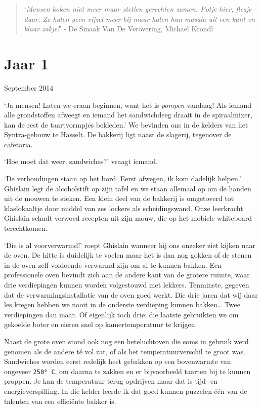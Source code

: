\documentclass[
  11pt,
  dutch,
]{memoir}
\begin{document}
\label{leerschool}

\begin{quote}
`\emph{Mensen koken niet meer maar stellen gerechten samen. Potje hier,
flesje daar. Ze halen geen vijzel meer bij maar halen hun masala uit een
kant-en-klaar zakje!}' - De Smaak Van De Verovering, Michael Krondl
\end{quote}

\hypertarget{jaar-1}{%
\section{Jaar 1}\label{jaar-1}}

\begin{flushright}
September 2014
\end{flushright}

`Ja mensen! Laten we eraan beginnen, want het is \emph{pompen} vandaag!
Als iemand alle grondstoffen afweegt en iemand het sandwichdeeg draait
in de spiraalmixer, kan de rest de taartvormpjes bekleden.' We bevinden
ons in de kelders van het Syntra-gebouw te Hasselt. De bakkerij ligt
naast de slagerij, tegenover de cafetaria.

`Hoe moet dat weer, sandwiches?' vraagt iemand.

`De verhoudingen staan op het bord. Eerst afwegen, ik kom dadelijk
helpen.' Ghislain legt de alcoholstift op zijn tafel en we staan
allemaal op om de handen uit de mouwen te steken. Een klein deel van de
bakkerij is omgetoverd tot klaslokaaltje door middel van zes lockers als
scheidingswand. Onze leerkracht Ghislain schudt verwoed recepten uit
zijn mouw, die op het mobiele whiteboard terechtkomen.

`Die is al voorverwarmd!' roept Ghislain wanneer hij ons onzeker ziet
kijken naar de oven. De hitte is duidelijk te voelen maar het is dan nog
gokken of de stenen in de oven zelf voldoende verwarmd zijn om al te
kunnen bakken. Een professionele oven bevindt zich aan de andere kant
van de grotere ruimte, waar drie verdiepingen kunnen worden volgestouwd
met lekkers. Tenminste, gegeven dat de verwarmingsinstallatie van de
oven goed werkt. Die drie jaren dat wij daar les kregen hebben we nooit
in de onderste verdieping kunnen bakken\ldots{} Twee verdiepingen dan
maar. Of eigenlijk toch drie: die laatste gebruikten we om gekoelde
boter en eieren snel op kamertemperatuur te krijgen.

Naast de grote oven stond ook nog een heteluchtoven die soms in gebruik
werd genomen als de andere té vol zat, of als het temperatuurverschil te
groot was. Sandwiches worden eerst redelijk heet gebakken op een
bovenwarmte van ongeveer \texttt{250°\ C}, om daarna te zakken en er
bijvoorbeeld taarten bij te kunnen proppen. Je kan de temperatuur terug
opdrijven maar dat is tijd- en energieverspilling. In die kelder leerde
ik dat goed kunnen puzzelen één van de talenten van een efficiënte
bakker is.
\end{document}
